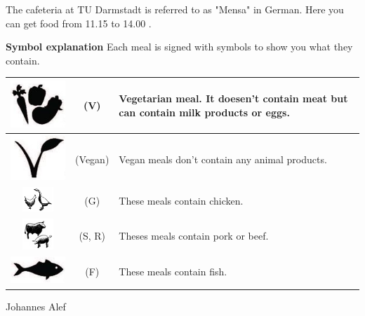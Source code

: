 {The cafeteria at TU Darmstadt is referred to as "Mensa" in German.
    Here you can get food from 11.15 to 14.00 .
}{


    \noindent\textbf{Symbol explanation}
    Each meal is signed with symbols to show you what they contain.

    \begin{tabular}{|c|c|p{3cm}|}
        \hline
        \rule{0pt}{1cm+1ex}\includegraphics[scale=0.5]{../grafik/artikel/vegetarian}  & (V)     & Vegetarian meal. It doesen't contain meat but can contain milk products or eggs. \\
        \hline
        \rule{0pt}{1cm+1ex}\includegraphics[scale=0.5]{../grafik/artikel/vegan}       & (Vegan) & Vegan meals don't contain any animal products.                                   \\
        \hline
        \rule{0pt}{1cm+1ex}\includegraphics[scale=0.5]{../grafik/artikel/chicken}     & (G)     & These meals contain chicken.                                                     \\
        \hline
        \rule{0pt}{1cm+1ex}\includegraphics[scale=0.5]{../grafik/artikel/porkandbeef} & (S, R)  & Theses meals contain pork or beef.                                               \\
        \hline
        \rule{0pt}{1cm+1ex}\includegraphics[scale=0.5]{../grafik/artikel/fish}        & (F)     & These meals contain fish.                                                        \\
        \hline
    \end{tabular}


}{Johannes Alef}
